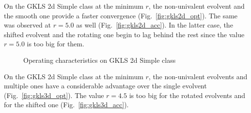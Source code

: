 \documentclass[3p,times,procedia]{elsarticle}
\begin{document}
On the GKLS 2d Simple class at the minimum \(r\), the non-univalent evolvent and the smooth
one provide a faster convergence (Fig.~\ref{fig:gkls2d_opt}). The same was observed at
\(r=5.0\) as well (Fig.~\ref{fig:gkls2d_acc}). In the latter case, the shifted evolvent and the
rotating one begin to lag behind the rest since the value \(r=5.0\) is too big for them.
\begin{figure}[ht]
    \centering

    \caption{Operating characteristics on GKLS 2d Simple class}
\end{figure}

On the GKLS 2d Simple class at the minimum \(r\), the non-univalent evolvents and multiple
ones have a considerable advantage over the single evolvent (Fig.~\ref{fig:gkls3d_opt}).
The value \(r=4.5\) is too big for the rotated evolvents and for the shifted one
(Fig.~\ref{fig:gkls3d_acc}).
\end{document}
